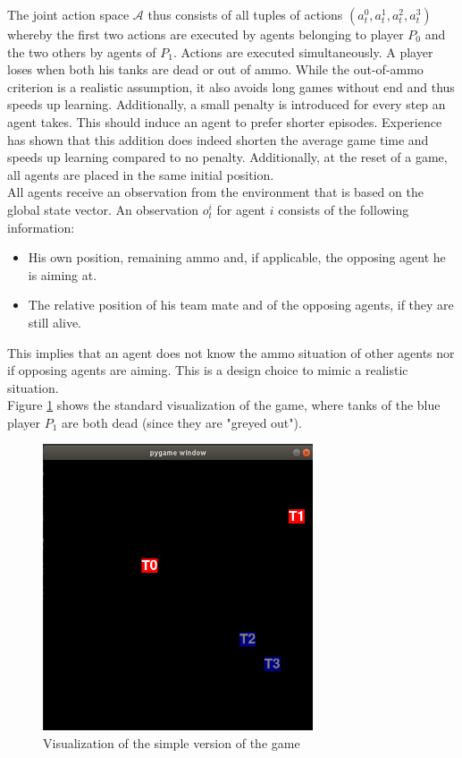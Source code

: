 The joint action space $\mathcal{A}$ thus consists of all tuples of actions $(a_t^0, a_t^1, a_t^2, a_t^3)$ whereby the first two actions are executed by agents belonging to player $P_0$ and the two others by agents of $P_1$. Actions are executed simultaneously. A player loses when both his tanks are dead or out of ammo. While the out-of-ammo criterion is a realistic assumption, it also avoids long games without end and thus speeds up learning. Additionally, a small penalty is introduced for every step an agent takes. This should induce an agent to prefer shorter episodes. Experience has shown that this addition does indeed shorten the average game time and speeds up learning compared to no penalty. Additionally, at the reset of a game, all agents are placed in the same initial position.\\
All agents receive an observation from the environment that is based on the global state vector. An observation $o^i_t$ for agent $i$ consists of the following information:
\begin{itemize}
    \item His own position, remaining ammo and, if applicable, the opposing agent he is aiming at.
    \item The relative position of his team mate and of the opposing agents, if they are still alive.
\end{itemize}
This implies that an agent does not know the ammo situation of other agents nor if opposing agents are aiming. This is a design choice to mimic a realistic situation.\\

Figure \ref{fig:game_visual} shows the standard visualization of the game, where tanks of the blue player $P_1$ are both dead (since they are "greyed out").

\begin{figure}[htp]
    \centering
    \includegraphics[width=8cm]{images/game_visual.png}
    \caption{Visualization of the simple version of the game}
    \label{fig:game_visual}
\end{figure}




